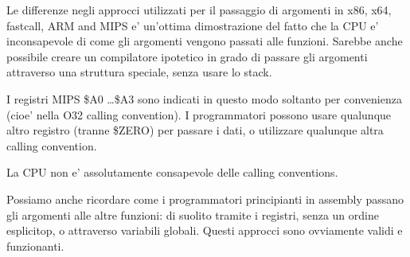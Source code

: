 
Le differenze negli approcci utilizzati per il passaggio di argomenti in x86, x64, 
fastcall, ARM and MIPS e' un'ottima dimostrazione del fatto che la CPU e' inconsapevole di come gli argomenti vengono passati alle funzioni. 
Sarebbe anche possibile creare un compilatore ipotetico in grado di passare gli argomenti attraverso una struttura speciale, senza usare lo stack.

I registri MIPS \$A0 \dots \$A3 sono indicati in questo modo soltanto per convenienza (cioe' nella O32 calling convention).
I programmatori possono usare qualunque altro registro (tranne \$ZERO) per passare i dati, o utilizzare qualunque altra calling convention. 

La \ac{CPU} non e' assolutamente consapevole delle calling conventions.

Possiamo anche ricordare come i programmatori principianti in assembly passano gli argomenti alle altre funzioni: 
di suolito tramite i registri, senza un ordine esplicitop, o attraverso variabili globali.
Questi approcci sono ovviamente validi e funzionanti.
